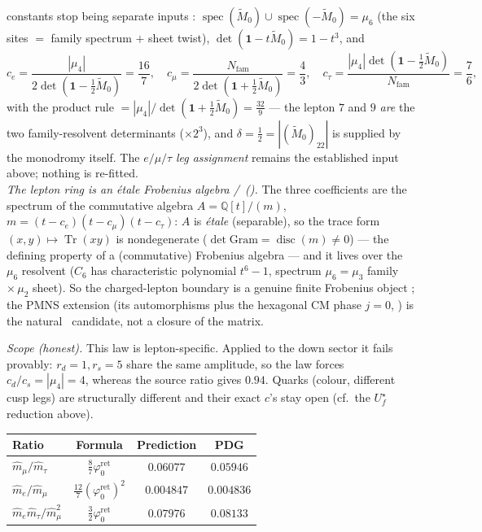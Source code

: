 \documentclass[11pt,a4paper]{article}
\newcommand{\Nfam}{N_{\mathrm{fam}}}
\newcommand{\phiz}{\varphi_0^{\mathrm{ret}}}
\theoremstyle{definition}
\renewcommand{\arraystretch}{1.15}
\begin{document}
\begin{keybox}[Where the lepton rationals come from: $\delta=\tfrac12$ resolvent $+$ product rule \mE]
constants stop being separate inputs \mE: $\operatorname{spec}(\widetilde M_0)\cup\operatorname{spec}(-\widetilde M_0)=\mu_6$
(the six sites $=$ family spectrum $+$ sheet twist), $\det(\mathbf1-t\widetilde M_0)=1-t^3$, and
\[
  c_e=\frac{|\mu_4|}{2\det(\mathbf1-\tfrac12\widetilde M_0)}=\frac{16}{7},\quad
  c_\mu=\frac{\Nfam}{2\det(\mathbf1+\tfrac12\widetilde M_0)}=\frac{4}{3},\quad
  c_\tau=\frac{|\mu_4|\det(\mathbf1-\tfrac12\widetilde M_0)}{\Nfam}=\frac{7}{6},
\]
with the product rule $=|\mu_4|/\det(\mathbf1+\tfrac12\widetilde M_0)=\tfrac{32}9$ --- the lepton $7$
and $9$ \emph{are} the two family-resolvent determinants ($\times2^3$), and $\delta=\tfrac12=
|(\widetilde M_0)_{22}|$ is supplied by the monodromy itself. The $e/\mu/\tau$ \emph{leg assignment}
remains the established input above; nothing is re-fitted.
\smallskip\\
\noindent\emph{The lepton ring is an \'etale Frobenius algebra \mE/\mC\ ().}
The three coefficients are the spectrum of the commutative algebra $A=\mathbb Q[t]/(m)$,
$m=(t{-}c_e)(t{-}c_\mu)(t{-}c_\tau)$: $A$ is \emph{\'etale} (separable), so the trace form
$(x,y)\mapsto\operatorname{Tr}(xy)$ is nondegenerate ($\det\mathrm{Gram}=\operatorname{disc}(m)\neq0$) --- the
defining property of a (commutative) Frobenius algebra --- and it lives over the $\mu_6$ resolvent
($C_6$ has characteristic polynomial $t^6{-}1$, spectrum $\mu_6=\mu_3$ family $\times\,\mu_2$ sheet). So the
charged-lepton boundary is a genuine finite Frobenius object \mE; the PMNS extension (its automorphisms plus
the hexagonal CM phase $j{=}0$, ) is the natural \mC\ candidate, not a
closure of the matrix.

\smallskip
\noindent\emph{Scope (honest).} This law is lepton-specific. Applied to the down sector it fails provably:
$r_d{=}1,r_s{=}5$ share the same amplitude, so the law forces $c_d/c_s{=}|\mu_4|{=}4$, whereas the source
ratio gives $0.94$. Quarks (colour, different cusp legs) are structurally different and their exact $c$'s
stay open (cf.\ the $U_f^\star$ reduction above).
\end{keybox}

\begin{center}\small
\renewcommand{\arraystretch}{1.15}
\begin{tabularx}{\linewidth}{@{}lccc@{}}
\toprule
\textbf{Ratio} & \textbf{Formula} & \textbf{Prediction} & \textbf{PDG} \\
\midrule
$\hat m_\mu/\hat m_\tau$ & $\tfrac87\phiz$ & $0.06077$ & $0.05946$ \\
$\hat m_e/\hat m_\mu$ & $\tfrac{12}{7}(\phiz)^2$ & $0.004847$ & $0.004836$ \\
$\hat m_e\hat m_\tau/\hat m_\mu^2$ & $\tfrac32\phiz$ & $0.07976$ & $0.08133$ \\
\bottomrule
\end{tabularx}
\end{center}
\end{document}
